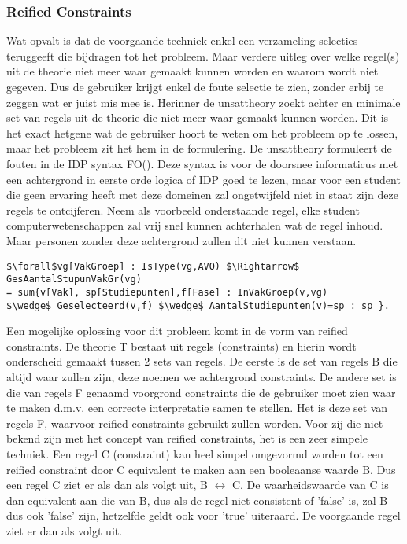 \subsubsection{Reified Constraints}
Wat opvalt is dat de voorgaande techniek enkel een verzameling selecties teruggeeft die bijdragen tot het probleem. Maar verdere uitleg over welke regel(s) uit de theorie niet meer waar gemaakt kunnen worden en waarom wordt niet gegeven. Dus de gebruiker krijgt enkel de foute selectie te zien, zonder erbij te zeggen wat er juist mis mee is. Herinner de unsattheory zoekt achter en minimale set van regels uit de theorie die niet meer waar gemaakt kunnen worden. Dit is het exact hetgene wat de gebruiker hoort te weten om het probleem op te lossen, maar het probleem zit het hem in de formulering. De unsattheory formuleert de fouten in de IDP syntax FO(\textperiodcentered). Deze syntax is voor de doorsnee informaticus met een achtergrond in eerste orde logica of IDP goed te lezen, maar voor een student die geen ervaring heeft met deze domeinen zal ongetwijfeld niet in staat zijn deze regels te ontcijferen. Neem als voorbeeld onderstaande regel, elke student computerwetenschappen zal vrij snel kunnen achterhalen wat de regel inhoud. Maar personen zonder deze achtergrond zullen dit niet kunnen verstaan.
\begin{lstlisting}[mathescape, caption=IDP Rule Example, frame=single]
$\forall$vg[VakGroep] : IsType(vg,AVO) $\Rightarrow$ GesAantalStupunVakGr(vg) 
= sum{v[Vak], sp[Studiepunten],f[Fase] : InVakGroep(v,vg) 
$\wedge$ Geselecteerd(v,f) $\wedge$ AantalStudiepunten(v)=sp : sp }.
\end{lstlisting}
Een mogelijke oplossing voor dit probleem komt in de vorm van reified constraints. De theorie T bestaat uit regels (constraints) en hierin wordt onderscheid gemaakt tussen 2 sets van regels. De eerste is de set van regels B die altijd waar zullen zijn, deze noemen we achtergrond constraints. De andere set is die van regels F genaamd voorgrond constraints die de gebruiker moet zien waar te maken d.m.v. een correcte interpretatie samen te stellen. Het is deze set van regels F, waarvoor reified constraints gebruikt zullen worden. Voor zij die niet bekend zijn met het concept van reified constraints, het is een zeer simpele techniek. Een regel C (constraint) kan heel simpel omgevormd worden tot een reified constraint door C equivalent te maken aan een booleaanse waarde B. Dus een regel C ziet er als dan als volgt uit, B $\leftrightarrow$ C. De waarheidswaarde van C is dan equivalent aan die van B, dus als de regel niet consistent of 'false' is, zal B dus ook 'false' zijn, hetzelfde geldt ook voor 'true' uiteraard. De voorgaande regel ziet er dan als volgt uit. 

